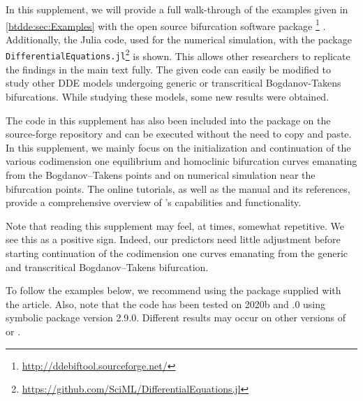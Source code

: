 In this supplement, we will provide a full walk-through of the examples given
in \cref{btdde:sec:Examples} with the open source bifurcation software package
\DDEBIFTOOL\footnote{\url{http://ddebiftool.sourceforge.net/}}
\cite{2014arXiv1406.7144S}. Additionally, the Julia code, used for the
numerical simulation, with the package {\tt
DifferentialEquations.jl}\footnote{\url{https://github.com/SciML/DifferentialEquations.jl}}
\cite{rackauckas2017differentialequations} is shown. This allows other researchers to replicate the findings in the main text fully. The given code can easily be modified to study other DDE models undergoing generic or transcritical Bogdanov-Takens bifurcations. While studying these models, some new results were
obtained.

The code in this supplement has also been included into the \DDEBIFTOOL package on the source-forge repository and can be executed without the need to copy and paste. In this supplement, we mainly focus on the initialization and continuation of the various codimension one equilibrium and homoclinic bifurcation curves emanating from the Bogdanov--Takens points and on numerical simulation near the bifurcation points. The online tutorials, as well as the manual and its references, provide a comprehensive overview of \DDEBIFTOOL's capabilities and functionality.

Note that reading this supplement may feel, at times, somewhat repetitive. We see
this as a positive sign. Indeed, our predictors need little adjustment
before starting continuation of the codimension one curves emanating from the
generic and transcritical Bogdanov--Takens bifurcation.

To follow the examples below, we recommend using the \DDEBIFTOOL package
supplied with the article. Also, note that the \MATLAB code has been tested on 
\MATLAB 2020b and .0 using \OCTAVE symbolic
package version 2.9.0. Different results may occur on other versions of 
\MATLAB or \OCTAVE.

